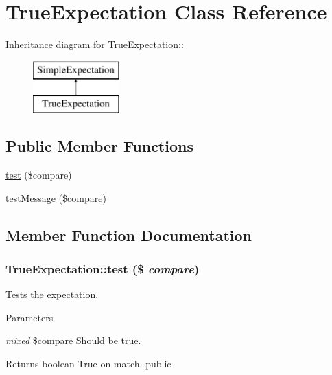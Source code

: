 \hypertarget{class_true_expectation}{
\section{TrueExpectation Class Reference}
\label{class_true_expectation}
}
Inheritance diagram for TrueExpectation::\begin{figure}[H]
\begin{center}
\leavevmode
\includegraphics[height=2cm]{class_true_expectation}
\end{center}
\end{figure}
\subsection*{Public Member Functions}
\begin{DoxyCompactItemize}
\item 
\hyperlink{class_true_expectation_a8a9057241e7d630877fcc92caa1d6cf4}{test} (\$compare)
\item 
\hyperlink{class_true_expectation_acf35201c91abb8313f31b7f1690ca3c8}{testMessage} (\$compare)
\end{DoxyCompactItemize}


\subsection{Member Function Documentation}
\hypertarget{class_true_expectation_a8a9057241e7d630877fcc92caa1d6cf4}{
\subsubsection[{test}]{\setlength{\rightskip}{0pt plus 5cm}TrueExpectation::test (\$ {\em compare})}}
\label{class_true_expectation_a8a9057241e7d630877fcc92caa1d6cf4}
Tests the expectation. 
\begin{DoxyParams}{Parameters}
\item[{\em mixed}]\$compare Should be true. \end{DoxyParams}
\begin{DoxyReturn}{Returns}
boolean True on match.  public 
\end{DoxyReturn}


